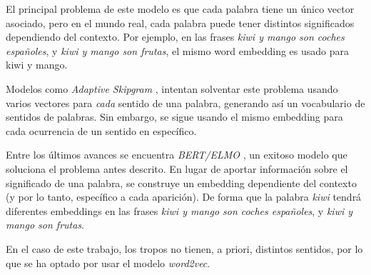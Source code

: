 El principal problema de este modelo es que cada palabra tiene un único vector asociado,
pero en el mundo real, cada palabra puede tener distintos significados dependiendo del contexto.
Por ejemplo, en las frases \emph{kiwi y mango son coches españoles}, y \emph{kiwi y mango son frutas},
el mismo word embedding es usado para kiwi y mango.

Modelos como \emph{Adaptive Skipgram} \cite{adaptiveskipgram}, intentan solventar este problema usando
varios vectores para \emph{cada} sentido de una palabra, generando así un vocabulario de sentidos de palabras.
Sin embargo, se sigue usando el mismo embedding para cada ocurrencia de un sentido en específico.

Entre los últimos avances se encuentra \emph{BERT/ELMO} \cite{bert}, un exitoso modelo que soluciona el
problema antes descrito. En lugar de aportar información sobre el significado de una palabra, se construye
un embedding dependiente del contexto (y por lo tanto, específico a cada aparición). De forma que la palabra
\emph{kiwi} tendrá diferentes embeddings en las frases \emph{kiwi y mango son coches españoles}, y
\emph{kiwi y mango son frutas}.

En el caso de este trabajo, los tropos no tienen, a priori, distintos sentidos, por lo que se ha optado
por usar el modelo \emph{word2vec}.
